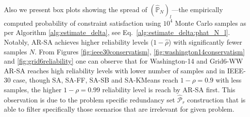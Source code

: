Also we present box plots showing the spread of $(\hat{\mathbb{P}}_N)_l$—the empirically computed probability of constraint satisfaction using $10^4$ Monte Carlo samples as per Algorithm \ref{alg:estimate_delta}, see Eq.~\ref{alg:estimate_delta:phat_N_l}. 
Notably, AR-SA achieves higher reliability levels ($1-\hat{\rho}$) with significantly fewer samples $N$. From Figures \ref{fig:ieee30conservatism},  \ref{fig:washington14conservatism} and \ref{fig:grid6reliability} one can observe that for Washington-14 and Grid6-WW AR-SA reaches high reliability levels with lower number of samples and in IEEE-30 case, though SA, SA-FF, SA-SB and SA-KMeans reach $1 - \rho = 0.9$ with less samples, the higher $1 - \rho =0.99$ reliability level is reach by AR-SA first. This observation is due to the problem specific redundancy set $\hat{\mathcal{P}}_r$ construction that is able to filter specifically those scenarios that are irrelevant for given problem.

